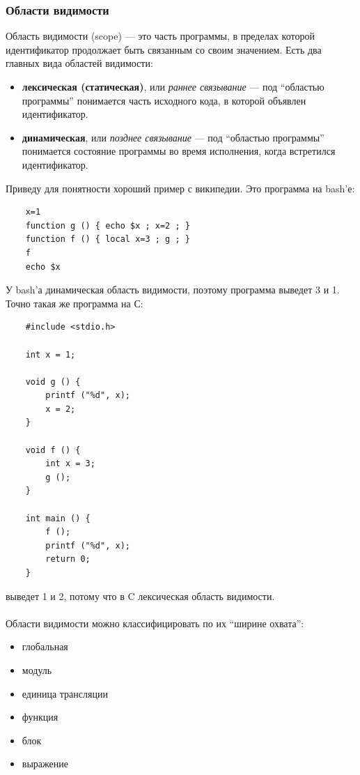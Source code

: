 \documentclass[11pt]{book}
\begin{document}
\subsubsection{Области видимости}
Область видимости (scope) --- это часть программы, в пределах которой идентификатор продолжает быть связанным со своим значением.
Есть два главных вида областей видимости:
\begin{itemize}
\item \textbf{лексическая (статическая)}, или \emph{раннее связывание} ---
    под ``областью программы'' понимается часть исходного кода, в которой объявлен идентификатор.
\item \textbf{динамическая}, или \emph{позднее связывание} ---
    под ``областью программы'' понимается состояние программы во время исполнения, когда встретился идентификатор.
\end{itemize}
Приведу для понятности хороший пример с википедии. Это программа на bash'е:
\begin{verbatim}
    x=1
    function g () { echo $x ; x=2 ; }
    function f () { local x=3 ; g ; }
    f
    echo $x
\end{verbatim}
У bash'а динамическая область видимости, поэтому программа выведет 3 и 1.
Точно такая же программа на С:
\begin{verbatim}
    #include <stdio.h>

    int x = 1;

    void g () {
        printf ("%d", x);
        x = 2;
    }

    void f () {
        int x = 3;
        g ();
    }

    int main () {
        f ();
        printf ("%d", x);
        return 0;
    }
\end{verbatim}
выведет 1 и 2, потому что в C лексическая область видимости.
\\ \\
Области видимости можно классифицировать по их ``ширине охвата'':
\begin{itemize}
\item глобальная
\item модуль
\item единица трансляции
\item функция
\item блок
\item выражение
\end{itemize}
\end{document}
